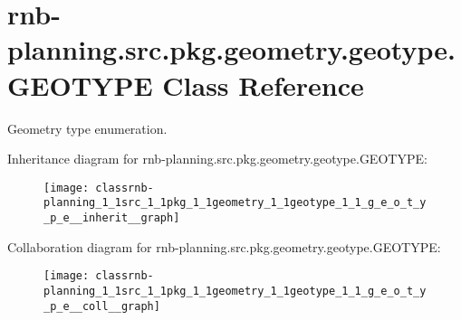 \hypertarget{classrnb-planning_1_1src_1_1pkg_1_1geometry_1_1geotype_1_1_g_e_o_t_y_p_e}{}\section{rnb-\/planning.src.\+pkg.\+geometry.\+geotype.\+G\+E\+O\+T\+Y\+PE Class Reference}
\label{classrnb-planning_1_1src_1_1pkg_1_1geometry_1_1geotype_1_1_g_e_o_t_y_p_e}


Geometry type enumeration.  




Inheritance diagram for rnb-\/planning.src.\+pkg.\+geometry.\+geotype.\+G\+E\+O\+T\+Y\+PE\+:\nopagebreak
\begin{figure}[H]
\begin{center}
\leavevmode
\texttt{[image: classrnb-planning\_1\_1src\_1\_1pkg\_1\_1geometry\_1\_1geotype\_1\_1\_g\_e\_o\_t\_y\_p\_e\_\_inherit\_\_graph]}
\end{center}
\end{figure}


Collaboration diagram for rnb-\/planning.src.\+pkg.\+geometry.\+geotype.\+G\+E\+O\+T\+Y\+PE\+:\nopagebreak
\begin{figure}[H]
\begin{center}
\leavevmode
\texttt{[image: classrnb-planning\_1\_1src\_1\_1pkg\_1\_1geometry\_1\_1geotype\_1\_1\_g\_e\_o\_t\_y\_p\_e\_\_coll\_\_graph]}
\end{center}
\end{figure}
